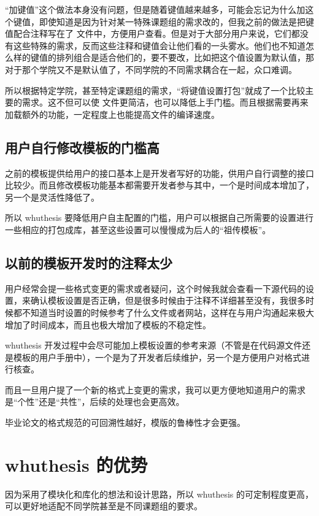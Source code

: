 “加键值”这个做法本身没有问题，但是随着键值越来越多，可能会忘记为什么加这个键值，即使知道是因为针对某一特殊课题组的需求改的，但我之前的做法是把键值配合注释写在了  文件中，方便用户查看。但是对于大部分用户来说，它们都没有这些特殊的需求，反而这些注释和键值会让他们看的一头雾水。他们也不知道怎么样的键值的排列组合是适合他们的，要不要改，比如把这个值设置为默认值，那对于那个学院又不是默认值了，不同学院的不同需求耦合在一起，众口难调。

所以根据特定学院，甚至特定课题组的需求，“将键值设置打包”就成了一个比较主要的需求。这不但可以使  文件更简洁，也可以降低上手门槛。而且根据需要再来加载额外的功能，一定程度上也能提高文件的编译速度。



\subsection{用户自行修改模板的门槛高}

之前的模板提供给用户的接口基本上是开发者写好的功能，供用户自行调整的接口比较少。而且修改模板功能基本都需要开发者参与其中，一个是时间成本增加了，另一个是灵活性降低了。

所以 whuthesis 要降低用户自主配置的门槛，用户可以根据自己所需要的设置进行一些相应的打包成库，甚至这些设置可以慢慢成为后人的“祖传模板”。


\subsection{以前的模板开发时的注释太少}

用户经常会提一些格式变更的需求或者疑问，这个时候我就会查看一下源代码的设置，来确认模板设置是否正确，但是很多时候由于注释不详细甚至没有，我很多时候都不知道当时设置的时候参考了什么文件或者网站，这样在与用户沟通起来极大增加了时间成本，而且也极大增加了模板的不稳定性。

whuthesis 开发过程中会尽可能加上模板设置的参考来源（不管是在代码源文件还是模板的用户手册中），一个是为了开发者后续维护，另一个是方便用户对格式进行核查。

而且一旦用户提了一个新的格式上变更的需求，我可以更方便地知道用户的需求是“个性”还是“共性”，后续的处理也会更高效。

毕业论文的格式规范的可回溯性越好，模版的鲁棒性才会更强。



\section{whuthesis 的优势}

因为采用了模块化和库化的想法和设计思路，所以 whuthesis 的可定制程度更高，可以更好地适配不同学院甚至是不同课题组的要求。